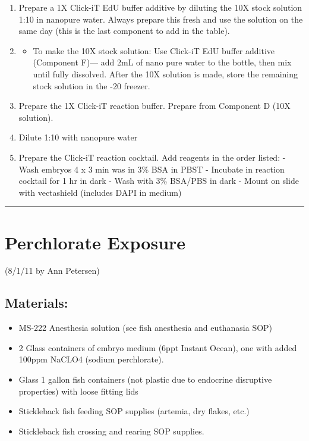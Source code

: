 \documentclass[
]{book}
\providecommand{\tightlist}{%
  \setlength{\itemsep}{0pt}\setlength{\parskip}{0pt}}
\begin{document}
\begin{enumerate}
\def\labelenumi{\arabic{enumi}.}
\item
  Prepare a 1X Click-iT EdU buffer additive by diluting the 10X stock solution 1:10 in nanopure water. Always prepare this fresh and use the solution on the same day (this is the last component to add in the table).
\item
  \begin{itemize}
  \tightlist
  \item
    To make the 10X stock solution: Use Click-iT EdU buffer additive (Component F)--- add 2mL of nano pure water to the bottle, then mix until fully dissolved. After the 10X solution is made, store the remaining stock solution in the -20 freezer.
  \end{itemize}
\item
  Prepare the 1X Click-iT reaction buffer. Prepare from Component D (10X solution).
\item
  Dilute 1:10 with nanopure water
\item
  Prepare the Click-iT reaction cocktail. Add reagents in the order listed:
  - Wash embryos 4 x 3 min was in 3\% BSA in PBST
  - Incubate in reaction cocktail for 1 hr in dark
  - Wash with 3\% BSA/PBS in dark
  - Mount on slide with vectashield (includes DAPI in medium)
\end{enumerate}

\begin{center}\rule{0.5\linewidth}{0.5pt}\end{center}

\hypertarget{perchlorate-exposure}{%
\section{Perchlorate Exposure}\label{perchlorate-exposure}}

(8/1/11 by Ann Petersen)

\hypertarget{materials-10}{%
\subsection{Materials:}\label{materials-10}}

\begin{itemize}
\tightlist
\item
  MS-222 Anesthesia solution (see fish anesthesia and euthanasia SOP)
\item
  2 Glass containers of embryo medium (6ppt Instant Ocean), one with added 100ppm NaCLO4 (sodium perchlorate).
\item
  Glass 1 gallon fish containers (not plastic due to endocrine disruptive properties) with loose fitting lids
\item
  Stickleback fish feeding SOP supplies (artemia, dry flakes, etc.)
\item
  Stickleback fish crossing and rearing SOP supplies.
\end{itemize}
\end{document}
